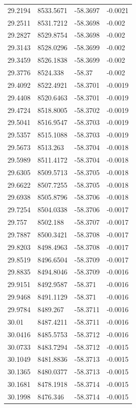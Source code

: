 \begin{table}[H]
\begin{tabular}{llll}
29.2194 & 8533.5671 & -58.3697 & -0.0021 \\
29.2511 & 8531.7212 & -58.3698 & -0.002 \\
29.2827 & 8529.8754 & -58.3698 & -0.002 \\
29.3143 & 8528.0296 & -58.3699 & -0.002 \\
29.3459 & 8526.1838 & -58.3699 & -0.002 \\
29.3776 & 8524.338 & -58.37 & -0.002 \\
29.4092 & 8522.4921 & -58.3701 & -0.0019 \\
29.4408 & 8520.6463 & -58.3701 & -0.0019 \\
29.4724 & 8518.8005 & -58.3702 & -0.0019 \\
29.5041 & 8516.9547 & -58.3703 & -0.0019 \\
29.5357 & 8515.1088 & -58.3703 & -0.0019 \\
29.5673 & 8513.263 & -58.3704 & -0.0018 \\
29.5989 & 8511.4172 & -58.3704 & -0.0018 \\
29.6305 & 8509.5713 & -58.3705 & -0.0018 \\
29.6622 & 8507.7255 & -58.3705 & -0.0018 \\
29.6938 & 8505.8796 & -58.3706 & -0.0018 \\
29.7254 & 8504.0338 & -58.3706 & -0.0017 \\
29.757 & 8502.188 & -58.3707 & -0.0017 \\
29.7887 & 8500.3421 & -58.3708 & -0.0017 \\
29.8203 & 8498.4963 & -58.3708 & -0.0017 \\
29.8519 & 8496.6504 & -58.3709 & -0.0017 \\
29.8835 & 8494.8046 & -58.3709 & -0.0016 \\
29.9151 & 8492.9587 & -58.371 & -0.0016 \\
29.9468 & 8491.1129 & -58.371 & -0.0016 \\
29.9784 & 8489.267 & -58.3711 & -0.0016 \\
30.01 & 8487.4211 & -58.3711 & -0.0016 \\
30.0416 & 8485.5753 & -58.3712 & -0.0016 \\
30.0733 & 8483.7294 & -58.3712 & -0.0015 \\
30.1049 & 8481.8836 & -58.3713 & -0.0015 \\
30.1365 & 8480.0377 & -58.3713 & -0.0015 \\
30.1681 & 8478.1918 & -58.3714 & -0.0015 \\
30.1998 & 8476.346 & -58.3714 & -0.0015 \\

\end{tabular}
\end{table}
